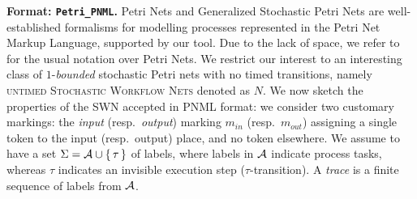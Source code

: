 
\textbf{{Format: \texttt{Petri\_PNML}}.} Petri Nets and Generalized Stochastic Petri Nets are well-established formalisms \cite{DBLP:journals/tosem/PolyvyanyySWCM20} for modelling processes \cite{RoggeSoltiAW13} represented in the Petri Net Markup Language, supported by our tool. Due to the lack of space, we refer to \cite{spdwe} for the usual notation over Petri Nets. We restrict our interest to an interesting class of $1$-\textit{bounded} stochastic Petri nets with no timed transitions, namely \textsc{untimed Stochastic Workflow Nets} denoted as $N$. We now sketch the properties of the SWN accepted in PNML format: we consider two customary markings: the \emph{input} (resp.~\emph{output}) marking $m_{in}$ (resp.~$m_{out}$) assigning a single token to the input (resp.~output) place, and no token elsewhere. We assume to have a set $\Sigma = \mathcal{A} \cup \set{\tau}$ of labels, where labels in $\mathcal{A}$ indicate process tasks, whereas $\tau$ indicates an invisible execution step ($\tau$-transition). A \emph{trace} is a finite sequence of labels from $\mathcal{A}$.
